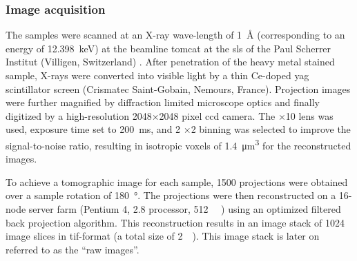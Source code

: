 \subsubsection{Image acquisition}
The samples were scanned at an X-ray wave-length of \SI{1}{\angstrom} (corresponding to an energy of \SI{12.398}{\kilo\electronvolt}) at the beamline \ac{tomcat} at the \acf{sls} of the Paul Scherrer Institut (Villigen, Switzerland) \cite{Stampanoni2002,Stampanoni2007}. After penetration of the heavy metal stained sample, X-rays were converted into visible light by a thin Ce-doped \acs{yag} scintillator screen (Crismatec Saint-Gobain, Nemours, France). Projection images were further magnified by diffraction limited microscope optics and finally digitized by a high-resolution 2048$\times$2048 pixel \ac{ccd} camera. The $\times$10 lens was used, exposure time set to \SI{200}{\milli\second}, and 2 $\times$2 binning was selected to improve the signal-to-noise ratio, resulting in isotropic voxels of \SI{1.4}{\micro\meter\cubed} for the reconstructed images.

To achieve a tomographic image for each sample, 1500 projections were obtained over a sample rotation of \SI{180}{\degree}. The projections were then reconstructed on a 16-node server farm (Pentium 4, \SI{2.8}{\gigahertz} processor, \SI{512}{\mega\byte} ) using an optimized filtered back projection algorithm. This reconstruction results in an image stack of 1024 image slices in tif-format (a total size of \SI{2}{\giga\byte}). This image stack is later on referred to as the ``raw images''.

